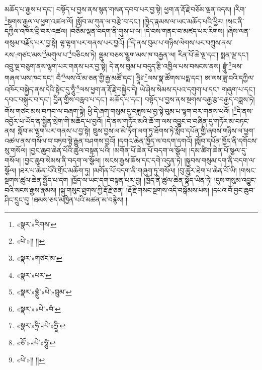 མཆོད་པ་རྒྱས་པ་དང་། བསྟོད་པ་བྱས་ནས་སྙན་གསན་དབབ་པར་བྱ་སྟེ། ཕྱག་ན་རྡོ་རྗེ་བཅོམ་ལྡན་འདས། །རིག་\footnote{«སྣར་»རིགས་}སྔགས་རྒྱལ་ལ་ཕྱག་འཚལ་ལོ། །སློབ་མ་ཀུན་ལ་བརྩེ་བ་དང་། །ཁྱེད་རྣམས་ལ་ཡང་མཆོད་པའི་ཕྱིར། །སང་ནི་དཀྱིལ་འཁོར་བྲི་བར་འཚལ། །བཅོམ་ལྡན་བདག་ནི་གུས་པ་ལ། །དེ་བས་གནང་བ་མཛད་པར་རིགས། །ཞེས་ལན་གསུམ་བརྗོད་པར་བྱ་སྟེ། ལྷ་ལྷག་པར་གནས་པར་བྱའོ། །\footnote{«པེ་»།། །།}དེ་ནས་བུམ་པ་གཉིས་ལེགས་པར་བཀྲུས་ནས་རས་:གཙང་མས་\footnote{«སྣར་»གཙང་མ་}མགུལ་པ་\footnote{«སྣར་»པར་}བཅིངས་ཏེ། ལྡུམ་བཅས་ལྕུག་མས་ཁ་བརྒྱན་ལ། རིན་པོ་ཆེ་ལྔ་དང་། སྨན་ལྔ་དང་། འབྲུ་ལྔ་བཅུག་ནས་ལྷག་པར་གནས་པར་བྱ་སྟེ། དེ་ནས་བུམ་པ་བདུད་རྩི་འཁྱིལ་པས་བསངས་ནས། བྷྲཱུཾ་\footnote{«སྣར་»བྷྲུཾ་«པེ་»བྲུམ་}ལས་གཞལ་ཡས་ཁང་དང་། བྃ་\footnote{«སྣར་»«པེ་»བཾ་}ལས་འོ་མ་ཅན་གྱི་རྒྱ་མཚོ་དང་། ཧྲཱིཿ་\footnote{«སྣར་»ཧྲི་«པེ་»ཧྲཱི་}ལས་སྣ་ཚོགས་པདྨ་དང་། ཨ་ལས་ཟླ་བའི་དཀྱིལ་འཁོར་བསྐྱེད་ནས་དེའི་སྟེང་དུ་ཧཱུྃ་\footnote{«ཅོ་»«པེ་»ཧཱུཾ་}ལས་ཕྱག་ན་རྡོ་རྗེ་བསྐྱེད་དེ། ཡེ་ཤེས་སེམས་དཔའ་དགུག་པ་དང་། གཞུག་པ་དང་། དབང་བསྐུར་བ་དང་། བྱིན་གྱིས་བརླབ་པ་དང་། མཆོད་པ་དང་། བསྟོད་པ་བྱས་ནས་སྔགས་བརྒྱ་རྩ་བརྒྱད་བཟླས་ཏེ། གོས་གཙང་མས་བཀབ་ལ་བཞག་སྟེ། ཕྱི་དེ་ཞག་གསུམ་དུ་བཟླས་པ་བྱ་སྟེ་བུམ་པ་ལྷག་བར་གནས་པའོ། །\footnote{«པེ་»།། །།}དེ་ནས་འབྱོར་པ་ཡོད་ན་སྦྱིན་སྲེག་གི་མཆོད་པ་བྱའོ། །དེ་ནས་གཏོར་མའི་ཆོ་ག་ལས་འབྱུང་བ་བཞིན་དུ་གཏོར་མ་བཏང་ནས། སློབ་མ་ལྷག་པར་གནས་པ་བྱ་སྟེ། ཁྲུས་བྱས་ལ་མེ་ཏོག་ལག་ཏུ་ཐོགས་ཏེ་སློབ་དཔོན་གྱི་ཞབས་གཉིས་ལ་ཕྱག་འཚལ་ནས་གསོལ་བ་བཏབ་སྟེ་རྒྱུན་བཤགས་བྱའོ། །དགའ་ཆེན་ཁྱོད་ལ་བདག་དགའོ། །སློབ་དཔོན་ཁྱོད་ནི་དགོངས་སུ་གསོལ། །བྱང་ཆུབ་ཆེན་པོའི་ཚུལ་བསྟན་པའི། །མགོན་པོ་ཆེན་པོ་བདག་ལ་སྩོལ། །དམ་ཚིག་ཆེན་པོ་སྩལ་དུ་གསོལ། །བྱང་ཆུབ་སེམས་ནི་བདག་ལ་སྩོལ། །སངས་རྒྱས་ཆོས་དང་དགེ་འདུན་ཏེ། །སྐྱབས་གསུམ་དག་ནི་བདག་ལ་སྩོལ། །ཐར་པ་ཆེན་པོའི་གྲོང་མཆོག་ཏུ། །མགོན་པོ་བདག་ནི་གཞུག་ཏུ་གསོལ། །བུ་ཚུར་ཐེག་པ་ཆེན་པོ་ཡི། །གསང་སྔགས་ཚུལ་ཆེན་སྤྱོད་པ་དག །ཁྱོད་ལ་ཡང་དག་བསྟན་པར་བྱ། །ཁྱོད་ནི་ཚུལ་ཆེན་སྣོད་ཡིན་ཏེ། །དུས་གསུམ་འབྱུང་བའི་སངས་རྒྱས་རྣམས། །སྐུ་གསུང་ཐུགས་ཀྱི་རྡོ་རྗེ་ཅན། །རྡོ་རྗེ་གསང་སྔགས་འདི་བསྒོམས་པས། །དཔའ་བོ་བྱང་ཆུབ་ཤིང་དྲུང་དུ། །ཐམས་ཅད་མཁྱེན་པའི་མཚན་མ་བརྙེས། །
